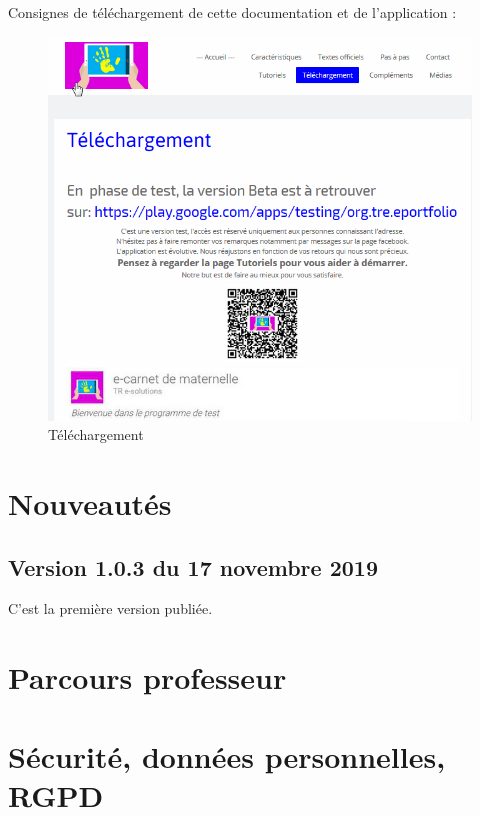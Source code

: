 \documentclass[oneside]{book}
\begin{document}
Consignes de téléchargement de cette documentation
et de l'application :

\begin{figure}
\centering
\includegraphics{./screenshots/2018-02-06-06-41-57.png}
\caption{Téléchargement}
\end{figure}

\hypertarget{nouveautuxe9s}{%
\section{Nouveautés}\label{nouveautuxe9s}}

\hypertarget{version-1.0.3-du-17-novembre-2019}{%
\subsection{Version 1.0.3 du 17 novembre
2019}\label{version-1.0.3-du-17-novembre-2019}}

C'est la première version publiée.

\hypertarget{parcours-professeur}{%
\section{Parcours professeur}\label{parcours-professeur}}

\hypertarget{suxe9curituxe9-donnuxe9es-personnelles-rgpd}{%
\section{\texorpdfstring{Sécurité, données personnelles,
RGPD}{Sécurité, données personnelles, RGPD}}\label{suxe9curituxe9-donnuxe9es-personnelles-rgpd}}
\end{document}
